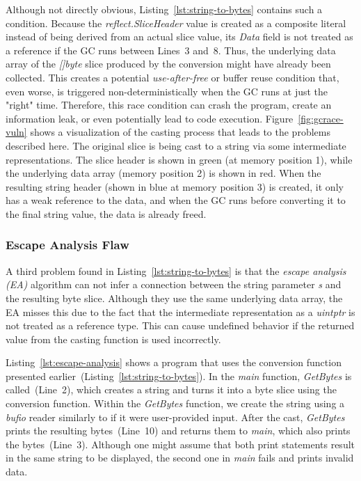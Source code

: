 Although not directly obvious, Listing~\ref{lst:string-to-bytes} contains such a condition.
Because the \textit{reflect.SliceHeader} value is created as a composite literal instead of being derived from an actual slice value, its \textit{Data} field is not treated as a reference if the GC runs between Lines~3 and~8. 
Thus, the underlying data array of the \textit{[]byte} slice produced by the conversion might have already been collected.
This creates a potential \textit{use-after-free} or buffer reuse condition that, even worse, is triggered non-deterministically when the GC runs at just the "right" time.
Therefore, this race condition can crash the program, create an information leak, or even potentially lead to code execution.
Figure~\ref{fig:gcrace-vuln} shows a visualization of the casting process that leads to the problems described here.
The original slice is being cast to a string via some intermediate representations.
The slice header is shown in green (at memory position 1), while the underlying data array (memory position 2) is shown in red.
When the resulting string header (shown in blue at memory position 3) is created, it only has a weak reference to the data, and when the GC runs before converting it to the final string value, the data is already freed.




\subsubsection*{Escape Analysis Flaw}

A third problem found in Listing~\ref{lst:string-to-bytes} is that the \textit{escape analysis (EA)} algorithm can not infer a connection between the string parameter \textit{s} and the resulting byte slice.
Although they use the same underlying data array, the EA misses this due to the fact that the intermediate representation as a \textit{uintptr} is not treated as a reference type.
This can cause undefined behavior if the returned value from the casting function is used incorrectly.

Listing~\ref{lst:escape-analysis} shows a program that uses the conversion function presented earlier~(Listing~\ref{lst:string-to-bytes}).
In the \textit{main} function, \textit{GetBytes} is called~(Line~2), which creates a string and turns it into a byte slice using the conversion function.
Within the \textit{GetBytes} function, we create the string using a \textit{bufio} reader similarly to if it were user-provided input.
After the cast, \textit{GetBytes} prints the resulting bytes~(Line~10) and returns them to \textit{main}, which also prints the bytes~(Line~3).
Although one might assume that both print statements result in the same string to be displayed, the second one in \textit{main} fails and prints invalid data.



